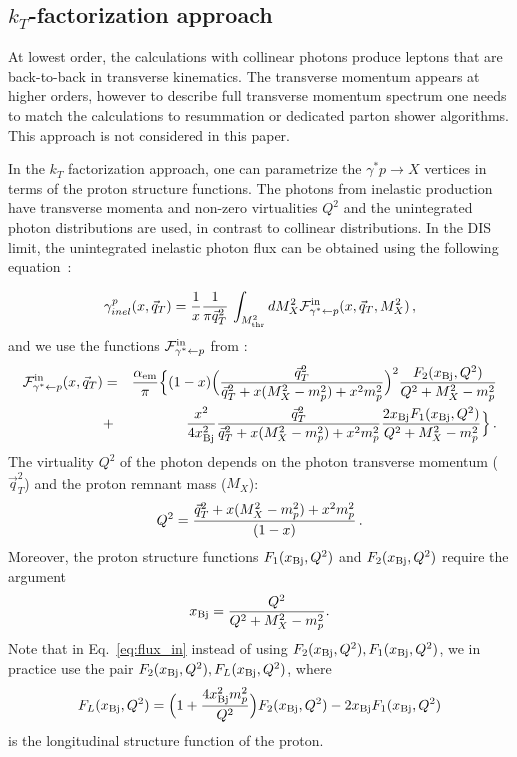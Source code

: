 \subsection{$k_T$-factorization approach}


At lowest order, the calculations with collinear photons  produce leptons that are back-to-back in transverse kinematics.
The transverse momentum appears at higher orders, however to describe full transverse momentum spectrum  one needs  
to match the calculations to resummation or dedicated parton shower algorithms. This approach is not considered in this paper.

In the $k_T$ factorization approach, one can parametrize the $\gamma^*p \rightarrow X$ vertices in terms of the proton structure functions. The photons from inelastic production have transverse momenta and non-zero virtualities $Q^2$ and the unintegrated photon distributions are used, in contrast to collinear distributions.
In the DIS limit, the unintegrated inelastic photon flux can be obtained using the following equation~\cite{daSilveira:2014jla, Luszczak:2015aoa}:

\begin{eqnarray}
\gamma^p_{inel}(x,\vec{q}_T) = {1\over x} 
{1 \over \pi \vec{q}_T^2} \, \int_{M^2_{\rm thr}} dM_X^2 {\cal{F}}^{\mathrm{in}}_{\gamma^* \leftarrow p} (x,\vec{q}_T,M^2_X) \, ,
\end{eqnarray}
and we use the functions $ {\cal{F}}^{\mathrm{in}}_{\gamma^* \leftarrow p}$ from \cite{Budnev:1974de, Luszczak:2018ntp}:
\begin{eqnarray}
{\cal{F}}^{\mathrm{in}}_{\gamma^* \leftarrow p} (x,\vec{q}_T) &=& {\alpha_{\rm em} \over \pi} 
\Big\{(1-x) \Big( {\vec{q}_T^2 \over \vec{q}_T^2 + x (M_X^2 - m_p^2) + x^2 m_p^2  }\Big)^2  
{F_2(x_{\rm Bj},Q^2) \over Q^2 + M_X^2 - m_p^2}  \nonumber \\
&+& {x^2 \over 4 x^2_{\rm Bj}}  
{\vec{q}_T^2 \over \vec{q}_T^2 + x (M_X^2 - m_p^2) + x^2 m_p^2  }
{2 x_{\rm Bj} F_1(x_{\rm Bj},Q^2) \over Q^2 + M_X^2 - m_p^2} \Big\} \, .
\label{eq:flux_in}
\end{eqnarray}
The virtuality $Q^2$ of the photon depends on the photon transverse momentum ($\vec{q}_T^2$) and the proton remnant mass ($M_X$):
\begin{eqnarray}
Q^2 =  {\vec{q}_T^2 + x (M_X^2 - m_p^2) + x^2 m_p^2 \over (1-x)} \, .
\label{eq:q2}
\end{eqnarray}
Moreover, the proton structure functions $F_1(x_{\rm Bj},Q^2)$ and $F_2(x_{\rm Bj},Q^2)$ require the argument
\begin{eqnarray}
x_{\rm Bj} = {Q^2 \over Q^2+M^2_X -m_p^2}.
\end{eqnarray}
Note that in Eq.~\ref{eq:flux_in} instead of using $F_2(x_{\rm Bj},Q^2),F_1(x_{\rm Bj},Q^2)$, 
we in practice use the pair $F_2(x_{\rm Bj},Q^2),F_L(x_{\rm Bj},Q^2)$, where
\begin{eqnarray}
F_L(x_{\rm Bj},Q^2) = \Big( 1 + {4 x_{\rm Bj}^2 m_p^2 \over Q^2} \Big) F_2(x_{\rm Bj},Q^2) - 2 x_{\rm Bj} F_1(x_{\rm Bj},Q^2)
\end{eqnarray}
is the longitudinal structure function of the proton.

